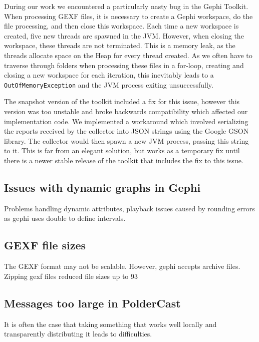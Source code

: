 During our work we encountered a particularly nasty bug in the Gephi
Toolkit. When processing GEXF files, it is necessary to create a Gephi
workspace, do the file processing, and then close this workspace. Each
time a new workspace is created, five new threads are spawned in the
JVM\@. However, when closing the workspace, these threads are not
terminated. This is a memory leak, as the threads allocate space on the
Heap for every thread created. As we often have to traverse through
folders when processing these files in a for-loop, creating and closing
a new workspace for each iteration, this inevitably leads to a
\texttt{OutOfMemoryException} and the JVM process exiting
unsuccessfully.

The snapshot version of the toolkit included a fix for this issue,
however this version was too unstable and broke backwards compatibility
which affected our implementation code. We implemented a workaround
which involved serializing the reports received by the collector into
JSON strings using the Google GSON~\cite{gson} library. The collector
would then spawn a new JVM process, passing this string to it.  This is
far from an elegant solution, but works as a temporary fix until there
is a newer stable release of the toolkit that includes the fix to this
issue.

\subsection{Issues with dynamic graphs in Gephi}
Problems handling dynamic attributes, playback issues caused by
rounding errors as gephi uses double to define intervals.

\subsection{GEXF file sizes}
The GEXF format may not be scalable. However, gephi accepts
archive files. Zipping gexf files reduced file sizes up to 93%

\subsection{Messages too large in PolderCast}
It is often the case that taking something that works well
locally and transparently distributing it leads to difficulties.
